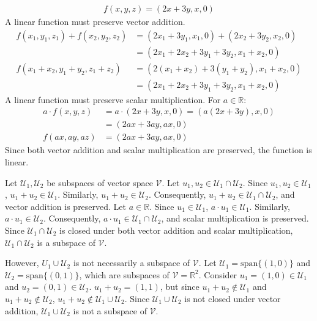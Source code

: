 \documentclass{article}
\begin{document}
\begin{align*}
    f(x, y, z) = (2x + 3y, x, 0)
\end{align*}
A linear function must preserve vector addition.
\begin{align*}
    f(x_1, y_1, z_1) + f(x_2, y_2, z_2) & = (2x_1 + 3y_1, x_1, 0) + (2x_2 + 3y_2, x_2, 0) \\
    & = (2x_1 + 2x_2 + 3y_1 + 3y_2, x_1 + x_2, 0) \\
    f(x_1 + x_2, y_1 + y_2, z_1 + z_2) & = (2(x_1 + x_2) + 3(y_1 + y_2), x_1 + x_2, 0) \\
    & = (2x_1 + 2x_2 + 3y_1 + 3y_2, x_1 + x_2, 0)
\end{align*}
A linear function must preserve scalar multiplication. For $a \in \mathbb{R}$:
\begin{align*}
    a \cdot f(x, y, z) & = a \cdot (2x + 3y, x, 0) = (a(2x + 3y), x, 0) \\
    & = (2ax + 3ay, ax, 0) \\
    f(ax, ay, az) & = (2ax + 3ay, ax, 0)
\end{align*}
Since both vector addition and scalar multiplication are preserved, the function is linear.
\clearpage

\problem{}
Let $\mathcal{U}_1, \mathcal{U}_2$ be subspaces of vector space $\mathcal{V}$. Let $u_1, u_2 \in \mathcal{U}_1 \cap \mathcal{U}_2$. Since $u_1, u_2 \in \mathcal{U}_1$, $u_1 + u_2 \in \mathcal{U}_1$. Similarly, $u_1 + u_2 \in \mathcal{U}_2$. Consequently, $u_1 + u_2 \in \mathcal{U}_1 \cap \mathcal{U}_2$, and vector addition is preserved. Let $a \in \mathbb{R}$. Since $u_1 \in \mathcal{U}_1$, $a \cdot u_1 \in \mathcal{U}_1$. Similarly, $a \cdot u_1 \in \mathcal{U}_2$. Consequently, $a \cdot u_1 \in \mathcal{U}_1 \cap \mathcal{U}_2$, and scalar multiplication is preserved. Since $\mathcal{U}_1 \cap \mathcal{U}_2$ is closed under both vector addition and scalar multiplication, $\mathcal{U}_1 \cap \mathcal{U}_2$ is a subspace of $\mathcal{V}$.

However, ${U}_1 \cup \mathcal{U}_2$ is not necessarily a subspace of $\mathcal{V}$. Let $\mathcal{U}_1 = \mathrm{span}\{(1, 0)\}$ and $\mathcal{U}_2 = \mathrm{span}\{(0, 1)\}$, which are subspaces of $\mathcal{V} = \mathbb{R}^2$. Consider $u_1 = (1, 0) \in \mathcal{U}_1$ and $u_2 = (0, 1) \in \mathcal{U}_2$. $u_1 + u_2 = (1, 1)$, but since $u_1 + u_2 \not\in \mathcal{U}_1$ and $u_1 + u_2 \not\in \mathcal{U}_2$, $u_1 + u_2 \not\in \mathcal{U}_1 \cup \mathcal{U}_2$. Since $\mathcal{U}_1 \cup \mathcal{U}_2$ is not closed under vector addition, $\mathcal{U}_1 \cup \mathcal{U}_2$ is not a subspace of $\mathcal{V}$.
\clearpage
\end{document}
